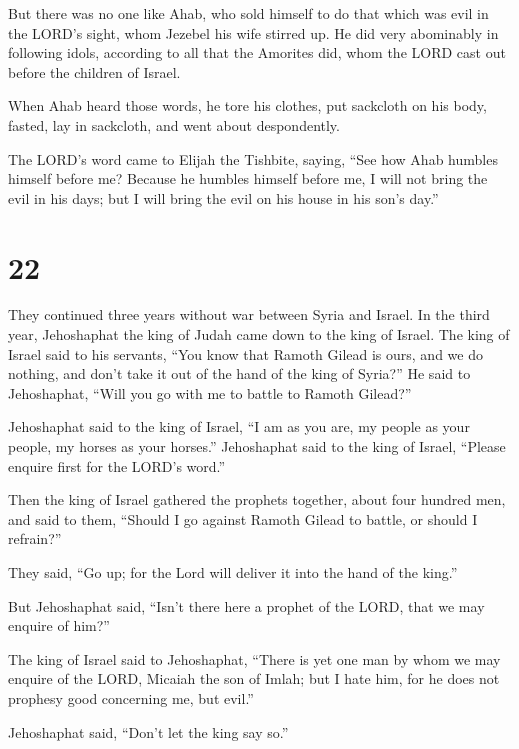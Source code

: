  But there was no one like Ahab, who sold himself to do
that which was evil in the LORD's sight, whom Jezebel his wife stirred
up.  He did very abominably in following idols, according
to all that the Amorites did, whom the LORD cast out before the children
of Israel.

 When Ahab heard those words, he tore his clothes, put
sackcloth on his body, fasted, lay in sackcloth, and went about
despondently.

 The LORD's word came to Elijah the Tishbite, saying,
 ``See how Ahab humbles himself before me? Because he
humbles himself before me, I will not bring the evil in his days; but I
will bring the evil on his house in his son's day.''

\hypertarget{section-21}{%
\section{22}\label{section-21}}

 They continued three years without war between Syria and
Israel.  In the third year, Jehoshaphat the king of Judah
came down to the king of Israel.  The king of Israel said
to his servants, ``You know that Ramoth Gilead is ours, and we do
nothing, and don't take it out of the hand of the king of Syria?''
 He said to Jehoshaphat, ``Will you go with me to battle
to Ramoth Gilead?''

Jehoshaphat said to the king of Israel, ``I am as you are, my people as
your people, my horses as your horses.''  Jehoshaphat said
to the king of Israel, ``Please enquire first for the LORD's word.''

 Then the king of Israel gathered the prophets together,
about four hundred men, and said to them, ``Should I go against Ramoth
Gilead to battle, or should I refrain?''

They said, ``Go up; for the Lord will deliver it into the hand of the
king.''

 But Jehoshaphat said, ``Isn't there here a prophet of the
LORD, that we may enquire of him?''

 The king of Israel said to Jehoshaphat, ``There is yet
one man by whom we may enquire of the LORD, Micaiah the son of Imlah;
but I hate him, for he does not prophesy good concerning me, but evil.''

Jehoshaphat said, ``Don't let the king say so.''


